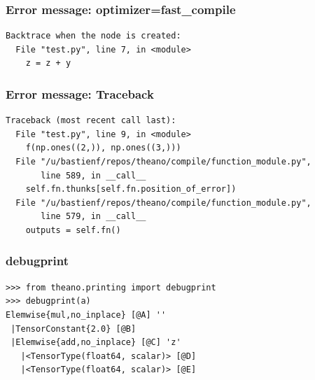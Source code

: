 \documentclass[utf8x,xcolor=pdftex,dvipsnames,table]{beamer}
\begin{document}
\begin{frame}[fragile]
  \frametitle{Error message: optimizer=fast\_compile}

\begin{lstlisting}
Backtrace when the node is created:
  File "test.py", line 7, in <module>
    z = z + y

\end{lstlisting}
\end{frame}

\begin{frame}[fragile]
  \frametitle{Error message: Traceback}

\begin{lstlisting}
Traceback (most recent call last):
  File "test.py", line 9, in <module>
    f(np.ones((2,)), np.ones((3,)))
  File "/u/bastienf/repos/theano/compile/function_module.py",
       line 589, in __call__
    self.fn.thunks[self.fn.position_of_error])
  File "/u/bastienf/repos/theano/compile/function_module.py",
       line 579, in __call__
    outputs = self.fn()

\end{lstlisting}
\end{frame}

\begin{frame}[fragile]
  \frametitle{debugprint}

\begin{lstlisting}
>>> from theano.printing import debugprint
>>> debugprint(a)
Elemwise{mul,no_inplace} [@A] ''
 |TensorConstant{2.0} [@B]
 |Elemwise{add,no_inplace} [@C] 'z'
   |<TensorType(float64, scalar)> [@D]
   |<TensorType(float64, scalar)> [@E]
\end{lstlisting}
\end{frame}



\end{document}
